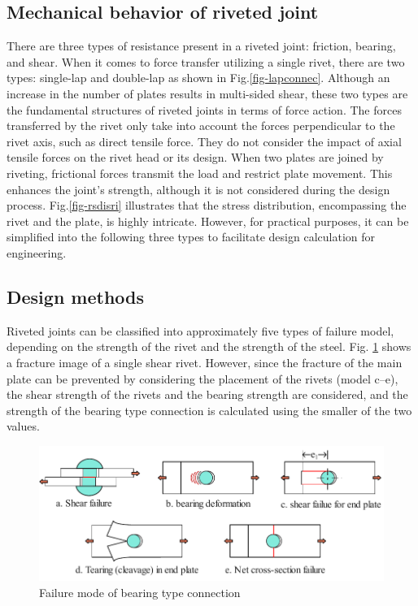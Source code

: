\subsection{Mechanical behavior of riveted joint}

There are three types of resistance present in a riveted joint: friction, bearing, and shear. When it comes to force transfer utilizing a single rivet, there are two types: single-lap and double-lap as shown in Fig.\ref{fig-lapconnec}. Although an increase in the number of plates results in multi-sided shear, these two types are the fundamental structures of riveted joints in terms of force action. The forces transferred by the rivet only take into account the forces perpendicular to the rivet axis, such as direct tensile force. They do not consider the impact of axial tensile forces on the rivet head or its design. When two plates are joined by riveting, frictional forces transmit the load and restrict plate movement. This enhances the joint's strength, although it is not considered during the design process. Fig.\ref{fig-rsdisri} illustrates that the stress distribution, encompassing the rivet and the plate, is highly intricate. However, for practical purposes, it can be simplified into the following three types to facilitate design calculation for engineering.

\subsection{Design methods}

Riveted joints can be classified into approximately five types of failure model, depending on the strength of the rivet and the strength of the steel. Fig. \ref{fig-beafalmode} shows a fracture image of a single shear rivet. However, since the fracture of the main plate can be prevented by considering the placement of the rivets (model c--e), the shear strength of the rivets and the bearing strength are considered, and the strength of the bearing type connection is calculated using the smaller of the two values. 

\begin{figure}[htbp]
    \centering
    \includegraphics{imgs/ch2/failure-mode-bea.pdf}
    \caption{Failure mode of bearing type connection}
    \label{fig-beafalmode}
\end{figure}

